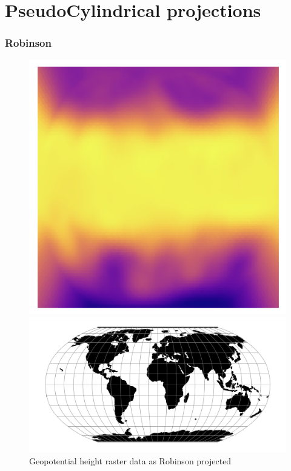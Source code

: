 \newpage
\section{PseudoCylindrical projections}
\subsubsection*{Robinson}
\begin{figure}[h]
    \centering
    \begin{minipage}{0.30\textwidth}
        \centering
        \includegraphics[width=0.9\linewidth]{figures/chapter-8/geopoth_robin.png}
        \caption{ Geopotential height raster data as Robinson projected}
        \label{fig:robin_geopoth_raster}
    \end{minipage}\hfill
    \begin{minipage}{0.30\textwidth}
        \centering
        \includegraphics[width=0.9\linewidth]{figures/chapter-8/robin.png}

\end{minipage}
\end{figure}

